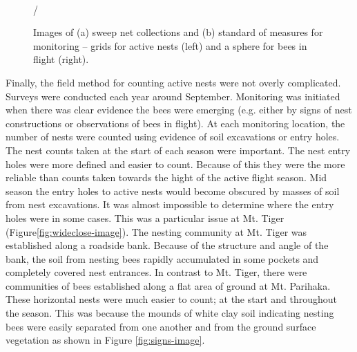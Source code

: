 \begin{figure}[!htbp] \myfloatalign
{} \\
/ \\
\caption [Images of sweep net collections.]{Images of (a) sweep net collections and (b) standard of measures for monitoring -- grids for active nests (left) and a sphere for bees in flight (right).}\label{fig:measures-image}
\end{figure}

Finally, the field method for counting active nests were not overly complicated. Surveys were conducted each year around September. Monitoring was initiated when there was clear evidence the bees were emerging (e.g. either by signs of nest constructions or observations of bees in flight). At each monitoring location, the number of nests were counted using evidence of soil excavations or entry holes. The nest counts taken at the start of each season were important. The nest entry holes were more defined and easier  to count. Because of this they were the more reliable than counts taken towards the hight of the active flight season. Mid season the entry holes to active nests would become obscured by masses of soil from nest excavations. It was almost impossible to determine where the entry holes were in some cases. This was a particular issue at Mt. Tiger (Figure\ref{fig:wideclose-image}). The nesting community at Mt. Tiger was established along a roadside bank. Because of the structure and angle of the bank, the soil from nesting bees rapidly accumulated in some pockets and completely covered nest entrances. In contrast to Mt. Tiger, there were communities of bees established along a flat area of ground at Mt. Parihaka. These horizontal nests were much easier to count; at the start and throughout the season. This was because the mounds of white clay soil indicating nesting bees were easily separated from one another and from the ground surface vegetation as shown in Figure \ref{fig:signs-image}.

